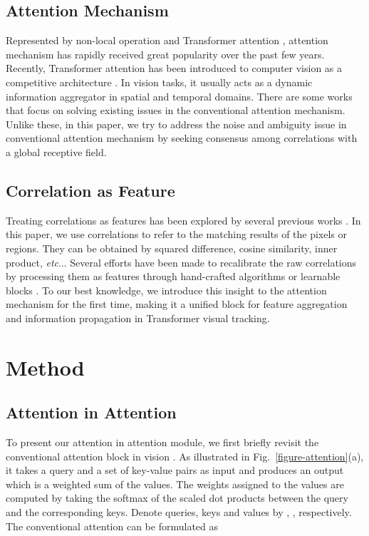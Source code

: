 \documentclass[runningheads]{llncs}
\makeatletter
\DeclareRobustCommand\onedot{\futurelet\@let@token\@onedot}
\def\@onedot{\ifx\@let@token.\else.\null\fi\xspace}
\def\etc{\emph{etc}\onedot} \def\vs{\emph{vs}\onedot}
\makeatother
\begin{document}
\subsection{Attention Mechanism}
Represented by non-local operation \cite{wang2018non} and Transformer attention \cite{vaswani2017attention}, attention mechanism has rapidly received great popularity over the past few years. Recently, Transformer attention has been introduced to computer vision as a competitive architecture \cite{carion2020end,zhu2020deformable,dosovitskiy2020image}. In vision tasks, it usually acts as a dynamic information aggregator in spatial and temporal domains. There are some works \cite{huang2019attention,huang2019ccnet} that focus on solving existing issues in the conventional attention mechanism. Unlike these, in this paper, we try to address the noise and ambiguity issue in conventional attention mechanism by seeking consensus among correlations with a global receptive field.

\subsection{Correlation as Feature}
Treating correlations as features has been explored by several previous works \cite{shechtman2007matching,sattler2009scramsac,bian2017gms,rocco2018neighbourhood,li2020correspondence,min2021convolutional,rocco2020efficient,cho2021cats,bhat2020know}. In this paper, we use correlations to refer to the matching results of the pixels or regions. They can be obtained by squared difference, cosine similarity, inner product, \etc. Several efforts have been made to recalibrate the raw correlations by processing them as features through hand-crafted algorithms \cite{sattler2009scramsac,bian2017gms} or learnable blocks \cite{rocco2018neighbourhood,min2021convolutional,li2020correspondence,bhat2020know,rocco2020efficient,cho2021cats}. To our best knowledge, we introduce this insight to the attention mechanism for the first time, making it a unified block for feature aggregation and information propagation in Transformer visual tracking.

\section{Method}

\subsection{Attention in Attention}
To present our attention in attention module, we first briefly revisit the conventional attention block in vision \cite{dosovitskiy2020image,carion2020end}. As illustrated in Fig.~\ref{figure-attention}(a), it takes a query and a set of key-value pairs as input and produces an output which is a weighted sum of the values. The weights assigned to the values are computed by taking the softmax of the scaled dot products between the query and the corresponding keys. Denote queries, keys and values by , ,  respectively. The conventional attention can be formulated as
\end{document}
